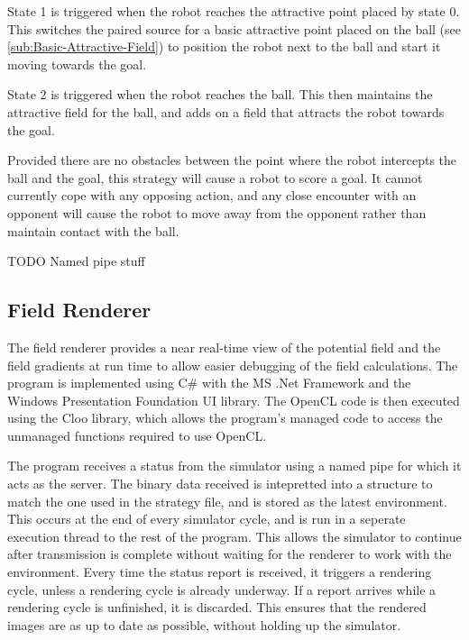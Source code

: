 \documentclass[10pt]{article}
\begin{document}
State 1 is triggered when the robot reaches the attractive point placed by state
0.  This switches the paired source for a basic attractive point placed on the
ball (see \ref{sub:Basic-Attractive-Field}) to position the robot next to the
ball and start it moving towards the goal.

State 2 is triggered when the robot reaches the ball.  This then maintains the
attractive field for the ball, and adds on a field that attracts the robot
towards the goal.

Provided there are no obstacles between the point where the robot intercepts the
ball and the goal, this strategy will cause a robot to score a goal.  It cannot
currently cope with any opposing action, and any close encounter with an
opponent will cause the robot to move away from the opponent rather than
maintain contact with the ball.

TODO Named pipe stuff

\subsection{Field Renderer}

The field renderer provides a near real-time view of the potential field and the
field gradients at run time to allow easier debugging of the field calculations.
The program is implemented using C\# with the MS .Net Framework and the Windows
Presentation Foundation UI library. The OpenCL code is then executed using the
Cloo library, which allows the program's managed code to access the unmanaged
functions required to use OpenCL.

The program receives a status from the simulator using a named pipe for which it
acts as the server. The binary data received is intepretted into a structure to
match the one used in the strategy file, and is stored as the latest
environment. This occurs at the end of every simulator cycle, and is run in a
seperate execution thread to the rest of the program. This allows the simulator
to continue after transmission is complete without waiting for the renderer to
work with the environment. Every time the status report is received, it triggers
a rendering cycle, unless a rendering cycle is already underway. If a report
arrives while a rendering cycle is unfinished, it is discarded. This ensures
that the rendered images are as up to date as possible, without holding up the
simulator.
\end{document}
